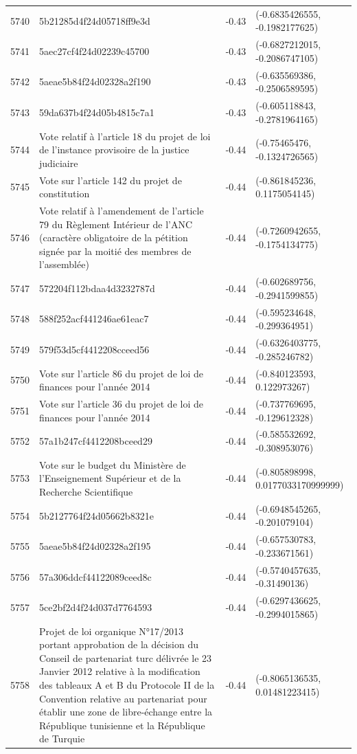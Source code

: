 \begin{table}[ht]
\begin{tabular}{rlrl}
  5740 & 5b21285d4f24d05718ff9e3d & -0.43 & (-0.6835426555, -0.1982177625) \\ 
  5741 & 5aec27cf4f24d02239c45700 & -0.43 & (-0.6827212015, -0.2086747105) \\ 
  5742 & 5aeae5b84f24d02328a2f190 & -0.43 & (-0.635569386, -0.2506589595) \\ 
  5743 & 59da637b4f24d05b4815c7a1 & -0.43 & (-0.605118843, -0.2781964165) \\ 
  5744 & Vote relatif à l'article 18 du projet de loi de l'instance provisoire de la justice judiciaire & -0.44 & (-0.75465476, -0.1324726565) \\ 
  5745 & Vote sur l'article 142 du projet de constitution & -0.44 & (-0.861845236, 0.1175054145) \\ 
  5746 & Vote relatif à l'amendement de l'article 79 du Règlement Intérieur de l'ANC (caractère obligatoire de la pétition signée par la moitié des membres de l'assemblée) & -0.44 & (-0.7260942655, -0.1754134775) \\ 
  5747 & 572204f112bdaa4d3232787d & -0.44 & (-0.602689756, -0.2941599855) \\ 
  5748 & 588f252acf441246ae61eac7 & -0.44 & (-0.595234648, -0.299364951) \\ 
  5749 & 579f53d5cf4412208cceed56 & -0.44 & (-0.6326403775, -0.285246782) \\ 
  5750 & Vote sur l'article 86 du projet de loi de finances pour l'année 2014 & -0.44 & (-0.840123593, 0.122973267) \\ 
  5751 & Vote sur l'article 36 du projet de loi de finances pour l'année 2014 & -0.44 & (-0.737769695, -0.129612328) \\ 
  5752 & 57a1b247cf4412208bceed29 & -0.44 & (-0.585532692, -0.308953076) \\ 
  5753 & Vote sur le budget du Ministère de l'Enseignement Supérieur et de la Recherche Scientifique & -0.44 & (-0.805898998, 0.0177033170999999) \\ 
  5754 & 5b2127764f24d05662b8321e & -0.44 & (-0.6948545265, -0.201079104) \\ 
  5755 & 5aeae5b84f24d02328a2f195 & -0.44 & (-0.657530783, -0.233671561) \\ 
  5756 & 57a306ddcf44122089ceed8c & -0.44 & (-0.5740457635, -0.31490136) \\ 
  5757 & 5ce2bf2d4f24d037d7764593 & -0.44 & (-0.6297436625, -0.2994015865) \\ 
  5758 & Projet de loi organique N°17/2013 portant approbation de la décision du Conseil de partenariat turc délivrée le 23 Janvier 2012 relative à la modification des tableaux A et B du Protocole II de la Convention relative au partenariat pour établir une zone de libre-échange entre la République tunisienne et la République de Turquie & -0.44 & (-0.8065136535, 0.01481223415) \\ 

\end{tabular}
\end{table}
